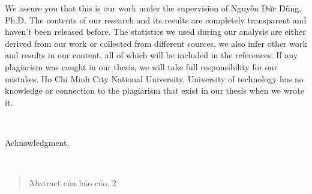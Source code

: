 \documentclass[12pt,a4paper,oneside]{book} %
\begin{document}

\coverpage
\frontmatter

\begin{declaration}
We assure you that this is our work under the supervision of Nguyễn Đức Dũng, Ph.D. The contents of our research and its results are completely transparent and haven't been released before. The statistics we used during our analysis are either derived from our work or collected from different sources, we also infer other work and results in our content, all of which will be included in the references.
\newline
\indent If any plagiarism was caught in our thesis, we will take full responsibility for our mistakes. Ho Chi Minh City National University, University of technology has no knowledge or connection to the plagiarism that exist in our thesis when we wrote it.
\end{declaration}
~

\begin{acknowledgments}

Acknowledgment.
	
\end{acknowledgments}
~

%
\begin{abstract}
Abstract của báo cáo.
2
\end{abstract}
 

\tableofcontents
\listoffigures


\mainmatter


\pagestyle{fancy}
\renewcommand{\chaptermark}[1]{\markboth{\MakeUppercase{#1}}{}}
\fancyhf{}
\fancyhead[LE,RO]{\leftmark}
\fancyhead[RE,LO]{}
\fancyfoot[LE,RO]{\thepage}
\renewcommand{\footrulewidth}{0.4pt}











{}



%
%
\end{document}
